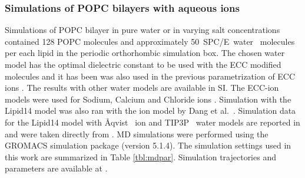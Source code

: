 \documentclass[aip,jcp,twocolumn]{revtex4}
\begin{document}
\subsubsection{Simulations of POPC bilayers with aqueous ions}
Simulations of POPC bilayer in pure water or in varying salt concentrations
contained 128 POPC molecules and approximately 50~SPC/E~water~\cite{Berendsen1987} molecules per each lipid
in the periodic orthorhombic simulation box. The chosen water model 
has the optimal dielectric constant
to be used with the ECC modified molecules  and it has been 
was also used in the previous parametrization of ECC
ions \cite{jungwirth17-new-paper-to-be-published, kohagen16, Pluharova2014}.
The results with other water models are available in SI.
The ECC-ion models  were used for Sodium, Calcium and Chloride
ions \cite{jungwirth17-new-paper-to-be-published, kohagen16, Pluharova2014}.  %
Simulation with the Lipid14 model was also ran with the ion model by
Dang et al.~\cite{smith94,chang1999,dang2006}.
Simulation data for the Lipid14 model with \AA{}qvist~\cite{aqvist90} ion and TIP3P~\cite{jorgensen83}
water models are reported in \cite{catte16} and
were taken directly from \cite{lipid14POPC0mMNaClfiles,lipid14POPC350mMCaClfiles,lipid14POPC350mMCaClfilesNC,lipid14POPC1000mMNaClfiles}. 
MD simulations were performed using the GROMACS \cite{Abraham15} simulation package (version 5.1.4).  
The simulation settings used in this work are 
summarized in Table \ref{tbl:mdpar}. 
Simulation trajectories and parameters are available at \cite{??} . 
\end{document}
